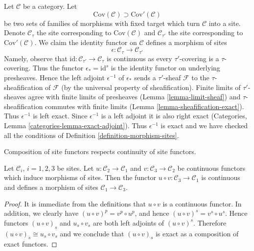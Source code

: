 \begin{example}
\label{example-finer-topology}
Let $\mathcal{C}$ be a category. Let
$$
\text{Cov}(\mathcal{C}) \supset \text{Cov}'(\mathcal{C})
$$
be two sets of families of morphisms with fixed target
which turn $\mathcal{C}$ into a site. Denote $\mathcal{C}_\tau$
the site corresponding to $\text{Cov}(\mathcal{C})$ and
$\mathcal{C}_{\tau'}$ the site corresponding to $\text{Cov}'(\mathcal{C})$.
We claim the identity functor on $\mathcal{C}$ defines a morphism of sites
$$
\epsilon : \mathcal{C}_\tau \longrightarrow \mathcal{C}_{\tau'}
$$
Namely, observe that $\text{id} : \mathcal{C}_{\tau'} \to \mathcal{C}_\tau$
is continuous as every
$\tau'$-covering is a $\tau$-covering. Thus the functor
$\epsilon_* = \text{id}^s$ is the identity functor on underlying
presheaves. Hence the left adjoint $\epsilon^{-1}$
of $\epsilon_*$ sends a $\tau'$-sheaf $\mathcal{F}$
to the $\tau$-sheafification of $\mathcal{F}$ (by the
universal property of sheafification).
Finite limits of $\tau'$-sheaves agree with finite limits
of presheaves (Lemma \ref{lemma-limit-sheaf}) and $\tau$-sheafification
commutes with finite limits (Lemma \ref{lemma-sheafification-exact}).
Thus $\epsilon^{-1}$ is left exact. Since $\epsilon^{-1}$
is a left adjoint it is also right exact
(Categories, Lemma \ref{categories-lemma-exact-adjoint}).
Thus $\epsilon^{-1}$ is exact and we have checked all the
conditions of Definition \ref{definition-morphism-sites}.
\end{example}

\begin{lemma}
\label{lemma-composition-morphisms-sites}
\begin{slogan}
Composition of site functors respects continuity of site functors.
\end{slogan}
Let $\mathcal{C}_i$, $i = 1, 2, 3$ be sites. Let
$u : \mathcal{C}_2 \to \mathcal{C}_1$ and
$v : \mathcal{C}_3 \to \mathcal{C}_2$ be continuous functors
which induce morphisms of sites. Then the functor
$u \circ v : \mathcal{C}_3 \to \mathcal{C}_1$ is continuous and
defines a morphism of sites $\mathcal{C}_1 \to \mathcal{C}_3$.
\end{lemma}

\begin{proof}
It is immediate from the definitions that $u \circ v$ is a continuous functor.
In addition, we clearly have $(u \circ v)^p = v^p \circ u^p$, and hence
$(u \circ v)^s = v^s \circ u^s$. Hence functors $(u \circ v)_s$  and
$u_s \circ v_s$ are both left adjoints of $(u \circ v)^s$. Therefore
$(u \circ v)_s \cong u_s \circ v_s$ and we conclude that $(u \circ v)_s$
is exact as a composition of exact functors.
\end{proof}

